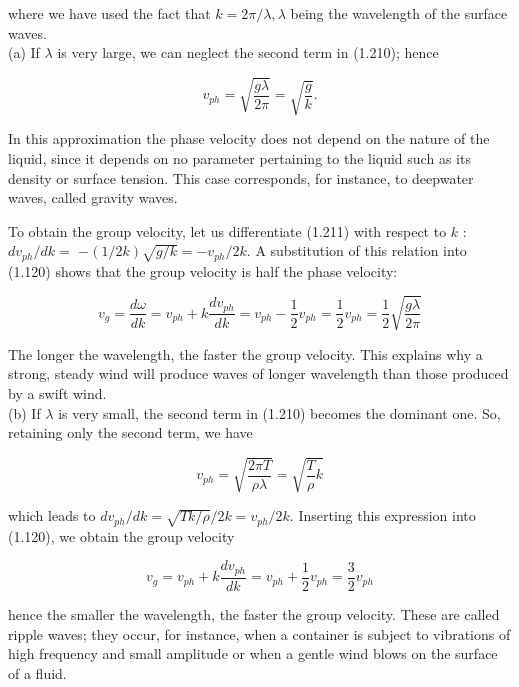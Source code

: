 \documentclass[10pt]{article}
\begin{document}
where we have used the fact that $k=2 \pi / \lambda, \lambda$ being the wavelength of the surface waves.\\
(a) If $\lambda$ is very large, we can neglect the second term in (1.210); hence


\begin{equation*}
v_{p h}=\sqrt{\frac{g \lambda}{2 \pi}}=\sqrt{\frac{g}{k}} . \tag{1.211}
\end{equation*}


In this approximation the phase velocity does not depend on the nature of the liquid, since it depends on no parameter pertaining to the liquid such as its density or surface tension. This case corresponds, for instance, to deepwater waves, called gravity waves.

To obtain the group velocity, let us differentiate (1.211) with respect to $k$ : $d v_{p h} / d k=$ $-(1 / 2 k) \sqrt{g / k}=-v_{p h} / 2 k$. A substitution of this relation into (1.120) shows that the group velocity is half the phase velocity:


\begin{equation*}
v_{g}=\frac{d \omega}{d k}=v_{p h}+k \frac{d v_{p h}}{d k}=v_{p h}-\frac{1}{2} v_{p h}=\frac{1}{2} v_{p h}=\frac{1}{2} \sqrt{\frac{g \lambda}{2 \pi}} \tag{1.212}
\end{equation*}


The longer the wavelength, the faster the group velocity. This explains why a strong, steady wind will produce waves of longer wavelength than those produced by a swift wind.\\
(b) If $\lambda$ is very small, the second term in (1.210) becomes the dominant one. So, retaining only the second term, we have


\begin{equation*}
v_{p h}=\sqrt{\frac{2 \pi T}{\rho \lambda}}=\sqrt{\frac{T}{\rho} k} \tag{1.213}
\end{equation*}


which leads to $d v_{p h} / d k=\sqrt{T k / \rho} / 2 k=v_{p h} / 2 k$. Inserting this expression into (1.120), we obtain the group velocity


\begin{equation*}
v_{g}=v_{p h}+k \frac{d v_{p h}}{d k}=v_{p h}+\frac{1}{2} v_{p h}=\frac{3}{2} v_{p h} \tag{1.214}
\end{equation*}


hence the smaller the wavelength, the faster the group velocity. These are called ripple waves; they occur, for instance, when a container is subject to vibrations of high frequency and small amplitude or when a gentle wind blows on the surface of a fluid.
\end{document}
